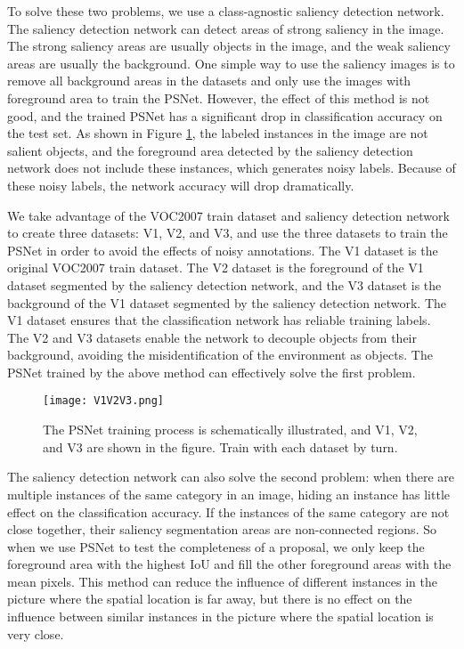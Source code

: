 \documentclass[final,3p,times,twocolumn]{elsarticle}
\begin{document}
To solve these two problems, we use a class-agnostic saliency detection network. The saliency detection network can detect areas of strong saliency in the image. The strong saliency areas are usually objects in the image, and the weak saliency areas are usually the background. One simple way to use the saliency images is to remove all background areas in the datasets and only use the images with foreground area to train the PSNet. However, the effect of this method is not good, and the trained PSNet has a significant drop in classification accuracy on the test set. As shown in Figure \ref{fig:figure3}, the labeled instances in the image are not salient objects, and the foreground area detected by the saliency detection network does not include these instances, which generates noisy labels. Because of these noisy labels, the network accuracy will drop dramatically.

We take advantage of the VOC2007 train dataset and saliency detection network to create three datasets: V1, V2, and V3, and use the three datasets to train the PSNet in order to avoid the effects of noisy annotations. The V1 dataset is the original VOC2007 train dataset. The V2 dataset is the foreground of the V1 dataset segmented by the saliency detection network, and the V3 dataset is the background of the V1 dataset segmented by the saliency detection network. The V1 dataset ensures that the classification network has reliable training labels. The V2 and V3 datasets enable the network to decouple objects from their background, avoiding the misidentification of the environment as objects. The PSNet trained by the above method can effectively solve the first problem.

\begin{figure}[t]
	\begin{center}
\texttt{[image: V1V2V3.png]}
	\end{center}
	\caption{The PSNet training process is schematically illustrated, and V1, V2, and V3 are shown in the figure. Train with each dataset by turn.}
	\label{fig:figure3}
\end{figure}

The saliency detection network can also solve the second problem: when there are multiple instances of the same category in an image, hiding an instance has little effect on the classification accuracy. If the instances of the same category are not close together, their saliency segmentation areas are non-connected regions. So when we use PSNet to test the completeness of a proposal, we only keep the foreground area with the highest IoU and fill the other foreground areas with the mean pixels. This method can reduce the influence of different instances in the picture where the spatial location is far away, but there is no effect on the influence between similar instances in the picture where the spatial location is very close.
\end{document}
